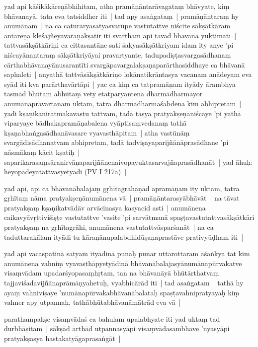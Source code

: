 \documentclass[article,a4paper]{memoir}
\newcommand{\persName}[1]{#1}
\begin{document}
	  \pstart yad api kā\-śikā\-kā\-reṇā\-bhihitam, atha pramā\-ṇā\-ntarā\-vagataṃ bhā\-vyate, kiṃ bhā\-vanayā\-, tata eva tatsiddher iti | tad apy asaṅgataṃ | pramā\-ṇā\-ntaraṃ hy anumā\-nam | na ca caturā\-ryasatyasvarū\-pe vastutattve niścite sā\-kṣā\-tkā\-ram antareṇa kleśajñeyā\-varaṇakṣatir iti svā\-rtham api tā\-vad bhā\-vanā\- yuktimatī\- | tattvasā\-kṣā\-tkā\-riṇi ca cittasantā\-ne sati śakyasā\-kṣā\-tkriyam idam ity anye 'pi niścayā\-nantaraṃ sā\-kṣā\-tkriyā\-yai pravartyante, tadupadiṣṭasvargasā\-dhanaṃ cā\-rthabhā\-vanayā\-nusarantī\-ti svargā\-pavargalakṣaṇaparā\-rthasiddhaye ca bhā\-vanā\- saphaleti | anyathā\- tattvā\-sā\-kṣā\-tkā\-riṇo lokā\-natikrā\-ntasya vacanam anā\-deyam eva syā\-d iti kva parā\-rthavā\-rtā\-pi | yac ca kiṃ ca tatpramā\-ṇam ityā\-dy ā\-rambhya tasmā\-d bhū\-tam abhū\-taṃ vety etatparyantena dharmā\-dharmayor anumā\-nā\-pravartanam uktam, tatra dharmā\-dharmaśabdena kim abhipretam | yadi kṣaṇikanirā\-tmakavastu tattvam, tadā\- tasya pratyakṣeṇā\-niścaye 'pi yathā\- viparyaye bā\-dhakapramā\-ṇabalena vyā\-ptisaṃvedanaṃ tathā\- kṣaṇabhaṅgasā\-dhanā\-vasare vyavasthā\-pitam | atha vastū\-nā\-ṃ svargā\-disā\-dhanatvam abhipretam, tadā\- tadviṣayaparijñā\-nā\-prasā\-dhane 'pi nā\-smā\-kaṃ kā\-cit kṣatiḥ | saparikarasaṃsā\-ranirvā\-ṇaparijñā\-nenaivopayuktasarvajñaprasā\-dhanā\-t | yad ā\-huḥ: heyopadeyatattvasyetyā\-di (PV I 217a) | 
	\pend
      

	  \pstart yad api, api ca bhā\-vanā\-balajaṃ gṛhī\-tagrahaṇā\-d apramā\-ṇam ity uktam, tatra gṛhī\-taṃ nā\-ma pratyakṣeṇā\-numā\-nena vā\- | pramā\-ṇā\-ntarasyā\-bhā\-vā\-t | na tā\-vat pratyakṣaṃ kṣaṇikatvā\-dā\-v arvā\-cī\-nasya kasyacid asti | anumā\-nena caikavyā\-vṛttiviśiṣṭe vastutattve 'vasite 'pi sarvā\-tmanā\- spaṣṭavastutattvasā\-kṣā\-tkā\-ri pratyakṣaṃ na gṛhī\-tagrā\-hi, anumā\-nena vastutattvā\-sparśanā\-t | na ca taduttarakā\-lam ityā\-di tu kā\-raṇā\-nupalabdhidū\-ṣaṇaprastā\-ve prativyū\-ḍham iti | 
	\pend
      

	  \pstart yad api \persName{vā\-caspatinā\-} satyam ityā\-dinā\- punaḥ punar uttarottaram ā\-śaṅkya tat kim anumā\-nena vahniṃ vyavasthā\-pyetyā\-dinā\- bhā\-vanā\-balajasyā\-numā\-napū\-rvakatve visaṃvā\-dam upadarśyopasaṃhṛtam, tan na bhā\-vanā\-yā\- bhū\-tā\-rthatvaṃ tajjaviśadavijñā\-naprā\-mā\-ṇyahetuḥ, vyabhicā\-rā\-d iti | tad asaṅgatam | tathā\- hy ayaṃ vahniviṣaye 'numā\-napū\-rvakabhā\-vanā\-balataḥ spaṣṭavahnipratyayaḥ kiṃ vahner apy utpannaḥ, tathā\-bhū\-tabhā\-vanā\-mā\-trā\-d eva vā\- |
	\pend
      

	  \pstart parathampakṣe visaṃvā\-daś ca bahulam upalabhyate iti yad uktaṃ tad durbhā\-ṣitam | sā\-kṣā\-d arthā\-d utpannasyā\-pi visaṃvā\-dasambhave 'nyasyā\-pi pratyakṣasya hastakatyā\-gaprasaṅgā\-t | 
	\pend
      
\end{document}
